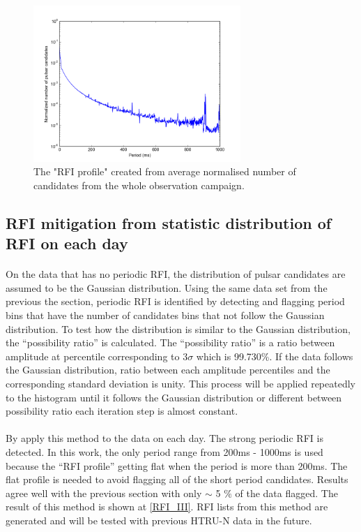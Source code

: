 \documentclass[thesis_msc.tex]{subfiles}
\begin{document}
\begin{figure}[h!] 
\centering
\includegraphics[width=0.7\textwidth]{figures/mean_profile.png}
\caption{The "RFI profile" created from average normalised number of candidates from the whole observation campaign.}
\label{RFI_profile}
\end{figure}

    \subsection{RFI mitigation from statistic distribution of RFI on each day}
    \paragraph{} On the data that has no periodic RFI, the distribution of pulsar candidates are assumed to be the Gaussian distribution. Using the same data set from the previous the section, periodic RFI is identified by detecting and flagging period bins that have the number of candidates bins that not follow the Gaussian distribution. To test how the distribution is similar to the Gaussian distribution, the ``possibility ratio'' is calculated.  The ``possibility ratio'' is a ratio between amplitude at percentile corresponding to $3\sigma$ which is 99.730\%. If the data follows the Gaussian distribution, ratio between each amplitude percentiles and the corresponding standard deviation is unity. This process will be applied repeatedly to the histogram until it follows the Gaussian distribution or different between possibility ratio each iteration step is almost constant.
    \paragraph{} By apply this method to the data on each day. The strong periodic RFI is detected. In this work, the only period range from 200ms - 1000ms is used because the ``RFI profile'' getting flat when the period is more than 200ms. The flat profile is needed to avoid flagging all of the short period candidates. Results agree well with the previous section with only $\sim$ 5 $\%$ of the data flagged. The result of this method is shown at \ref{RFI_III}. RFI lists from this method are generated and will be tested with previous HTRU-N data in the future. 
 
\end{document}
